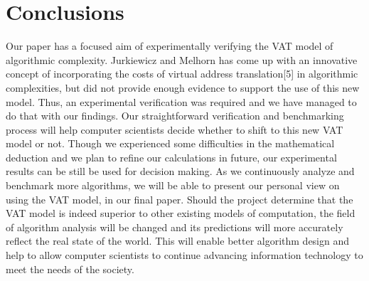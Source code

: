 \section{Conclusions}
Our paper has a focused aim of experimentally verifying the VAT model of 
algorithmic complexity. Jurkiewicz and Melhorn has come up with an innovative 
concept of incorporating the costs of virtual address translation[5] in 
algorithmic complexities, but did not provide enough evidence to support the 
use of this new model. Thus, an experimental verification was required and we 
have managed to do that with our findings. Our straightforward verification 
and benchmarking process will help computer scientists decide whether to shift 
to this new VAT model or not. Though we experienced some difficulties in the 
mathematical deduction and we plan to refine our calculations in future, our 
experimental results can be still be used for decision making. As we 
continuously analyze and benchmark more algorithms, we will be able to present 
our personal view on using the VAT model, in our final paper. Should the 
project determine that the VAT model is indeed superior to other existing 
models of computation, the field of algorithm analysis will be changed and its 
predictions will more accurately reflect the real state of the world. This will 
enable better algorithm design and help to allow computer scientists to 
continue advancing information technology to meet the needs of the society.
